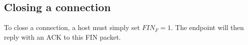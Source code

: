 \subsection{Closing a connection}

To close a connection, a host must simply set $FIN_F=1$. The endpoint
will then reply with an ACK to this FIN packet.